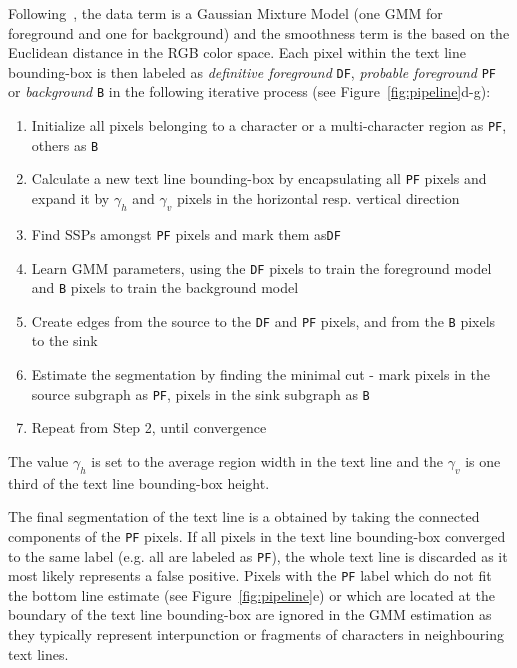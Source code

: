 \documentclass[conference]{IEEEtran}
\begin{document}
Following~\cite{rother2004grabcut}, the data term is a Gaussian Mixture Model (one GMM for foreground and one for background) and the smoothness term is the based on the Euclidean distance in the RGB color space. Each pixel within the text line bounding-box is then labeled as \emph{definitive foreground} \texttt{DF}, \emph{probable foreground} \texttt{PF} or \emph{background} \texttt{B} in the following iterative process (see Figure~\ref{fig:pipeline}d-g):
\begin{enumerate}
  \item Initialize all pixels belonging to a character or a multi-character region as \texttt{PF}, others as \texttt{B}
  \item Calculate a new text line bounding-box by encapsulating all \texttt{PF} pixels and expand it by $\gamma_h$ and $\gamma_v$ pixels in the horizontal resp. vertical direction
  \item Find SSPs amongst \texttt{PF} pixels and mark them as\texttt{DF}
  \item Learn GMM parameters, using the \texttt{DF} pixels to train the foreground model and \texttt{B} pixels to train the background model
  \item Create edges from the source to the \texttt{DF} and \texttt{PF} pixels, and from the \texttt{B} pixels to the sink
  \item Estimate the segmentation by finding the minimal cut - mark pixels in the source subgraph as \texttt{PF}, pixels in the sink subgraph as \texttt{B}
  \item Repeat from Step 2, until convergence
\end{enumerate}

The value $\gamma_h$ is set to the average region width in the text line and the $\gamma_v$ is one third of the text line bounding-box height. 

The final segmentation of the text line is a obtained by taking the connected components of the \texttt{PF} pixels. If all pixels in the text line bounding-box converged to the same label (e.g. all are labeled as \texttt{PF}), the whole text line is discarded as it most likely represents a false positive. Pixels with the \texttt{PF} label which do not fit the bottom line estimate (see Figure~\ref{fig:pipeline}e) or which are located at the boundary of the text line bounding-box are ignored in the GMM estimation as they typically represent interpunction or fragments of characters in neighbouring text lines.
\end{document}
